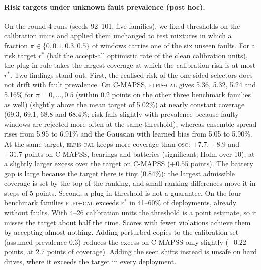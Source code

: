 \documentclass{esannV2}
\newcommand{\OSC}{\textsc{osc}}
\newcommand{\AUTO}{\textsc{elpis-cal}}
\begin{document}
\paragraph{Risk targets under unknown fault prevalence (post hoc).} On the round-4 runs (seeds 92--101, five families), we fixed thresholds on the calibration units and applied them unchanged to test mixtures in which a fraction $\pi\in\{0,0.1,0.3,0.5\}$ of windows carries one of the six unseen faults. For a risk target $r^\ast$ (half the accept-all optimistic rate of the clean calibration units), the plug-in rule takes the largest coverage at which the calibration risk is at most $r^\ast$. Two findings stand out. First, the realised risk of the one-sided selectors does not drift with fault prevalence. On C-MAPSS, \AUTO{} gives 5.36, 5.32, 5.24 and 5.16\% for $\pi=0,\dots,0.5$ (within 0.2 points on the other three benchmark families as well) (slightly above the mean target of 5.02\%) at nearly constant coverage (69.3, 69.1, 68.8 and 68.4\%; risk falls slightly with prevalence because faulty windows are rejected more often at the same threshold), whereas ensemble spread rises from 5.95 to 6.91\% and the Gaussian with learned bias from 5.05 to 5.90\%. At the same target, \AUTO{} keeps more coverage than \OSC: $+7.7$, $+8.9$ and $+31.7$ points on C-MAPSS, bearings and batteries (significant; Holm over 10), at a slightly larger excess over the target on C-MAPSS ($+0.55$ points). The battery gap is large because the target there is tiny (0.84\%): the largest admissible coverage is set by the top of the ranking, and small ranking differences move it in steps of 5 points. Second, a plug-in threshold is not a guarantee. On the four benchmark families \AUTO{} exceeds $r^\ast$ in 41--60\% of deployments, already without faults. With 4--26 calibration units the threshold is a point estimate, so it misses the target about half the time. Scores with fewer violations achieve them by accepting almost nothing. Adding perturbed copies to the calibration set (assumed prevalence 0.3) reduces the excess on C-MAPSS only slightly ($-0.22$ points, at 2.7 points of coverage). Adding the seen shifts instead is unsafe on hard drives, where it exceeds the target in every deployment.
\end{document}
